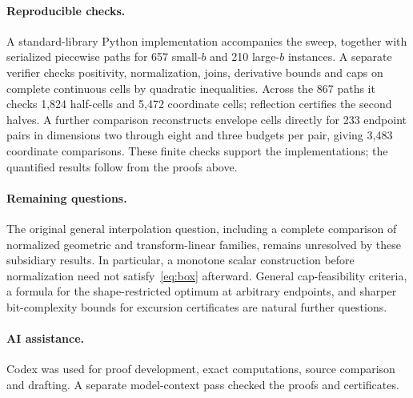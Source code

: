 \paragraph{Reproducible checks.}
A standard-library Python implementation accompanies the sweep, together with serialized piecewise paths for 657 small-$b$ and 210 large-$b$ instances. A separate verifier checks positivity, normalization, joins, derivative bounds and caps on complete continuous cells by quadratic inequalities. Across the 867 paths it checks 1,824 half-cells and 5,472 coordinate cells; reflection certifies the second halves. A further comparison reconstructs envelope cells directly for 233 endpoint pairs in dimensions two through eight and three budgets per pair, giving 3,483 coordinate comparisons. These finite checks support the implementations; the quantified results follow from the proofs above.

\paragraph{Remaining questions.}
The original general interpolation question, including a complete comparison of normalized geometric and transform-linear families, remains unresolved by these subsidiary results. In particular, a monotone scalar construction before normalization need not satisfy~\eqref{eq:box} afterward. General cap-feasibility criteria, a formula for the shape-restricted optimum at arbitrary endpoints, and sharper bit-complexity bounds for excursion certificates are natural further questions.

\paragraph{AI assistance.}
Codex was used for proof development, exact computations, source comparison and drafting. A separate model-context pass checked the proofs and certificates.
